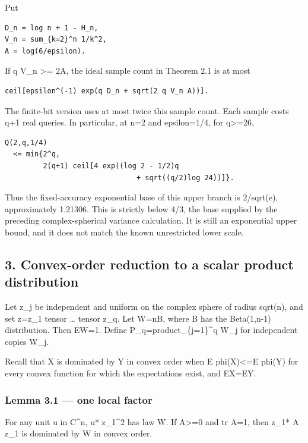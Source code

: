 \documentclass[
  10pt,
]{article}
\begin{document}
Put

\begin{verbatim}
D_n = log n + 1 - H_n,
V_n = sum_{k=2}^n 1/k^2,
A = log(6/epsilon).
\end{verbatim}

If q V\_n \textgreater= 2A, the ideal sample count in Theorem 2.1 is at
most

\begin{verbatim}
ceil[epsilon^(-1) exp(q D_n + sqrt(2 q V_n A))].
\end{verbatim}

The finite-bit version uses at most twice this sample count. Each sample
costs q+1 real queries. In particular, at n=2 and epsilon=1/4, for
q\textgreater=26,

\begin{verbatim}
Q(2,q,1/4)
  <= min{2^q,
         2(q+1) ceil[4 exp((log 2 - 1/2)q
                               + sqrt((q/2)log 24))]}.
\end{verbatim}

Thus the fixed-accuracy exponential base of this upper branch is
2/sqrt(e), approximately 1.21306. This is strictly below 4/3, the base
supplied by the preceding complex-spherical variance calculation. It is
still an exponential upper bound, and it does not match the known
unrestricted lower scale.

\subsection{3. Convex-order reduction to a scalar product
distribution}\label{convex-order-reduction-to-a-scalar-product-distribution}

Let z\_j be independent and uniform on the complex sphere of radius
sqrt(n), and set z=z\_1 tensor \ldots{} tensor z\_q. Let W=nB, where B
has the Beta(1,n-1) distribution. Then EW=1. Define
P\_q=product\_\{j=1\}\^{}q W\_j for independent copies W\_j.

Recall that X is dominated by Y in convex order when E phi(X)\textless=E
phi(Y) for every convex function for which the expectations exist, and
EX=EY.

\subsubsection{Lemma 3.1 --- one local
factor}\label{lemma-3.1-one-local-factor}

For any unit u in C\^{}n, \textbar u* z\_1\textbar\^{}2 has law W. If
A\textgreater=0 and tr A=1, then z\_1* A z\_1 is dominated by W in
convex order.
\end{document}
